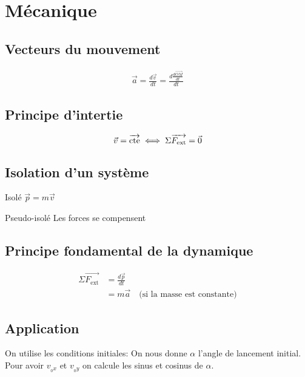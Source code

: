 \documentclass{article}
\newcommand{\vect}{\overrightarrow}
\newenvironment{definitions}{\begin{description}[leftmargin=!,labelwidth=\widthof{\bfseries Lorem ipsum dolor}]}{\end{description}}
\begin{document}
\newpage
\section{Mécanique}
\subsection{Vecteurs du mouvement}
\begin{equation*}
    \begin{split}
        \vec a = \frac{d\vec v}{dt} = \frac{d\frac{d\vect{OM}}{dt}}{dt}
    \end{split}
\end{equation*}

\subsection{Principe d'intertie}

$$
\vec{v} = \vect{\text{cte}} \iff \Sigma \vect{F_{\text{ext}}} = \vec{0} \\
$$

\subsection{Isolation d'un système}
\begin{definitions}
\item[Isolé] $\vec p = m \vec v$
\item[Pseudo-isolé] Les forces se compensent
\end{definitions}

\subsection{Principe fondamental de la dynamique}
\begin{equation*}
    \begin{split}
        \Sigma \vect{F_\text{ext}} &= \frac{d\vec p}{dt} \\
                                   &= m \vec a \quad \text{(si la masse est constante)}
    \end{split}
\end{equation*}

\subsection{Application}

On utilise les conditions initiales:
On nous donne $\alpha$ l'angle de lancement initial.
Pour avoir $v_{_0x}$ et $v_{_0y}$ on calcule les sinus et cosinus de $\alpha$.
\end{document}
